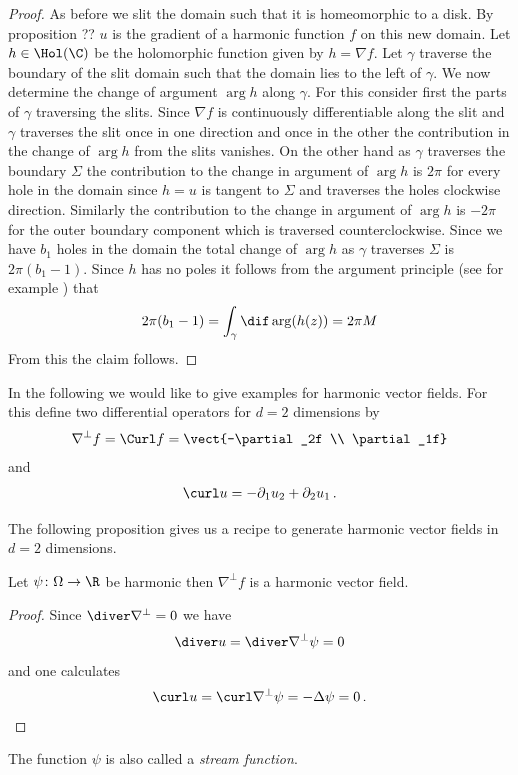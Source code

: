 \begin{proof}
  As before we slit the domain such that it is homeomorphic to a disk. By proposition ?? $u$ is the gradient of a
  harmonic function $f$ on this new domain. Let $h\in\Hol(\C)$ be the holomorphic function given by $h=\nabla f$.
  Let $\gamma$ traverse the boundary of the slit domain such that the domain lies to the left of $\gamma$.
  We now determine the change of argument $\arg h$ along $\gamma$. For this
  consider first the parts of $\gamma$ traversing the slits. Since $\nabla f$ is continuously differentiable
  along the slit and $\gamma$ traverses the slit once in one direction and once in the other 
  the contribution in the change of $\arg h$ from the slits vanishes.
  On the other hand as $\gamma$ traverses the boundary $\Sigma$ the contribution to the change in
  argument of $\arg h$ is $2\pi$ for every hole in the domain 
  since $h=u$ is tangent to $\Sigma$ and traverses the holes clockwise direction.
  Similarly the contribution to the change in argument of $\arg h$ is $-2\pi$ for the outer boundary component
  which is traversed counterclockwise.
  Since we have $b_1$ holes in the domain the total change of $\arg h$ as $\gamma$ traverses $\Sigma$ is
  $2\pi(b_1-1)$.
  Since $h$ has no poles it follows from the argument principle (see for example \cite[Chapter VIII]{Gamelin2001}) that
  \begin{align}
    2\pi(b_1-1)=\int_\gamma\dif\arg (h(z)) =  2\pi M
  \end{align}
  From this the claim follows.
\end{proof}

In the following we would like to give examples for harmonic vector fields.
For this define two differential operators for $d=2$ dimensions by
\begin{align*}
  \nabla^\perp f=\Curl f=\vect{-\partial_2f \\ \partial_1f}
\end{align*}
and
\begin{align*}
  \curl u=-\partial_1u_2+\partial_2u_1\,.
\end{align*}

The following proposition gives us a recipe to generate harmonic vector fields in $d=2$ dimensions.
\begin{proposition}
  Let $\psi\colon\Omega\to\R$ be harmonic then $\nabla^\perp f$ is a harmonic vector field.
\end{proposition} 
\begin{proof}
  Since $\diver \nabla^\perp=0$ we have
  \begin{align*}
    \diver u = \diver\nabla^\perp \psi=0
  \end{align*}
  and one calculates
  \begin{align*}
    \curl u = \curl\nabla^\perp \psi = -\Delta \psi = 0\,.
  \end{align*}
\end{proof}
The function $\psi$ is also called a \emph{stream function}.


